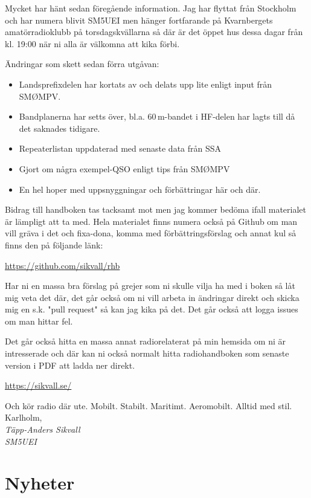 Mycket har hänt sedan föregående information. Jag har flyttat från
Stockholm och har numera blivit SM5UEI men hänger fortfarande på
Kvarnbergets amatörradioklubb på torsdagskvällarna så där är det öppet
hus dessa dagar från kl. 19:00 när ni alla är välkomna att kika förbi.

Ändringar som skett sedan förra utgåvan:

\begin{itemize}[]
	\item Landsprefixdelen har kortats av och delats upp lite enligt 
	input från SMØMPV.
	\item Bandplanerna har setts över, bl.a. 60\,m-bandet i HF-delen 
	har lagts till då det saknades tidigare.
	\item Repeaterlistan uppdaterad med senaste data från SSA
	\item Gjort om några exempel-QSO enligt tips från SMØMPV
	\item En hel hoper med uppsnyggningar och förbättringar här och där.
\end{itemize}

Bidrag till handboken tas tacksamt mot men jag kommer bedöma ifall
materialet är lämpligt att ta med.  Hela materialet finns numera också
på Github om man vill gräva i det och fixa-dona, komma med 
förbättrings\-förslag och annat kul så finns den på följande länk:

\href{https://github.com/sikvall/rhb/}{https://github.com/sikvall/rhb}

Har ni en massa bra förslag på grejer som ni skulle vilja ha med i boken
så låt mig veta det där, det går också om ni vill arbeta in ändringar direkt
och skicka mig en s.k. "pull request" så kan jag kika på det. Det går också
att logga issues om man hittar fel.

Det går också hitta en massa annat radiorelaterat på min hemsida om ni är intresserade och där kan ni också normalt hitta radiohandboken som senaste version i PDF att ladda ner direkt.

\href{https://sikvall.se}{https://sikvall.se/}

Och kör radio där ute. Mobilt. Stabilt. Maritimt. Aeromobilt. Alltid med
stil.\\[4em]

Karlholm, \DokumentDatum\\
\textit{Täpp-Anders Sikvall\\
	SM5UEI}

\clearpage

\section*{Nyheter}


